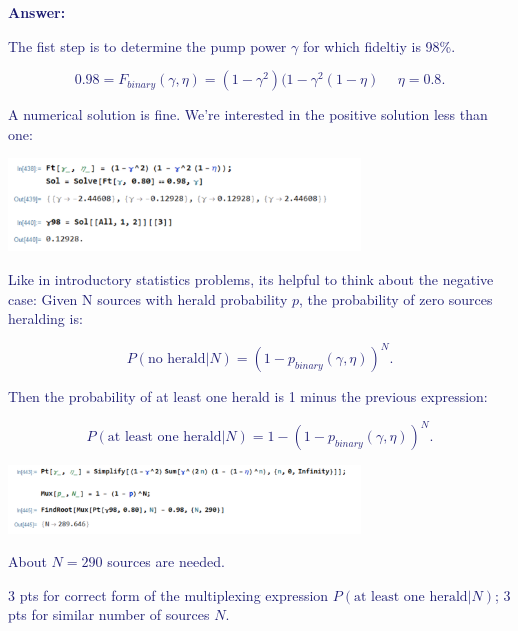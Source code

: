 \documentclass[11pt]{caltech_thesis} %
\begin{document}
\begin{enumerate}
  \textcolor{midnightblue}{ \textbf{Answer:} }

  \textcolor{midnightblue}{The fist step is to determine the pump power $\gamma$ for which fideltiy is 98\%. }

  \textcolor{midnightblue}{

  $$0.98 = F_{binary}(\gamma, \eta) = (1 - \gamma^2)(1 - \gamma^2(1 - \eta)\,\,\,\,\,\,\,\, \eta = 0.8.$$

  }

  \textcolor{midnightblue}{ A numerical solution is fine. We're interested in the positive solution less than one:}

  \textcolor{midnightblue}{\includegraphics[width=0.7\textwidth,height=\textheight]{./chapter_07/figs/Ftsolve.PNG}}

  \textcolor{midnightblue}{Like in introductory statistics problems, its helpful to think about the negative case: Given N sources with herald probability $p$, the probability of zero sources heralding is:}

  \textcolor{midnightblue}{

  $$P(\text{no herald}|N) = (1 - p_{binary}\left(\gamma, \eta\right))^N.$$

  }

  \textcolor{midnightblue}{Then the probability of at least one herald is 1 minus the previous expression:}

  \textcolor{midnightblue}{

  $$P(\text{at least one herald}|N) = 1 - (1 - p_{binary}\left(\gamma, \eta\right))^N.$$

  }

  \textcolor{midnightblue}{\includegraphics[width=0.7\textwidth,height=\textheight]{./chapter_07/figs/mux_binary.PNG}}

  \textcolor{midnightblue}{About $\boxed{N = 290}$ sources are needed.}

  \textcolor{midnightblue}{3 pts for correct form of the multiplexing expression
  $P(\text{at least one herald}|N)$; 3 pts for similar number of sources $N$.}
\end{enumerate}
\end{document}
